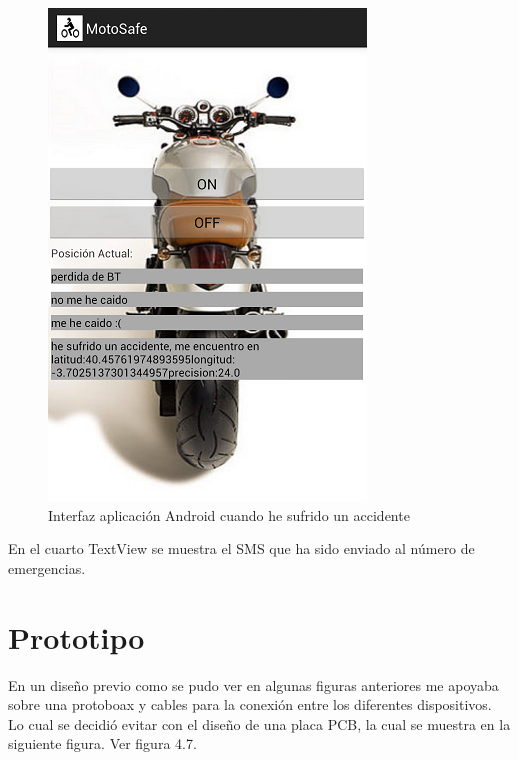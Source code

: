 		\begin{figure}[h]
			\centering
			\includegraphics{imagenes/accidente.png}
			\caption{Interfaz aplicación Android cuando he sufrido un accidente}
			\label{contexto:figura}
		\end{figure}
		
		En el cuarto TextView se muestra el SMS que ha sido enviado al número de emergencias.
		
		\section{Prototipo}
		
		En un diseño previo como se pudo ver en algunas figuras anteriores me apoyaba sobre una protoboax y cables para la conexión entre los diferentes dispositivos. Lo cual se decidió evitar con el dise\~no de una placa PCB, la cual se muestra en la siguiente figura. Ver figura 4.7.
		
